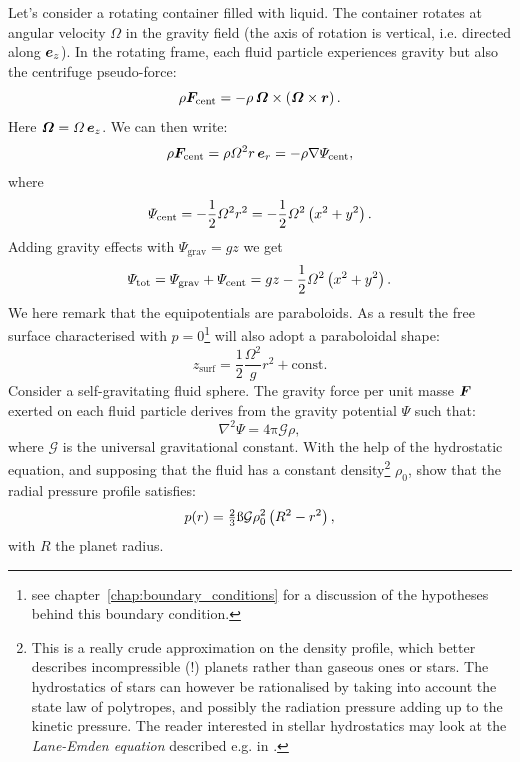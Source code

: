  Let's consider a rotating container filled with liquid. The container rotates at angular velocity $\Omega$ in the gravity field (the axis of rotation is vertical, i.e. directed along  $\matrixsym e_{z}$). In the rotating frame, each fluid particle experiences gravity but also the centrifuge pseudo-force:
\begin{equation}
\rho\bF_\text{cent} = -\rho \,\matrixsym \Omega \times \lp \matrixsym  \Omega \times \matrixsym r\rp.
\end{equation}
Here $\matrixsym \Omega = \Omega \,\matrixsym e_{z}$. We can then write:
\begin{equation}
\rho\bF_\text{cent} = \rho \Omega^2 r \,\matrixsym e_{r} = -\rho \nabla \Psi_\text{cent},
\end{equation}
where
\begin{equation}
\Psi_\text{cent} = -\frac{1}{2} \Omega^2 r^2 = -\frac{1}{2} \Omega^2 \left( x^2 + y^2\right).
\end{equation}
Adding gravity effects with $\Psi_\text{grav} = gz$ we get 
\begin{equation}
\Psi_\text{tot} = \Psi_\text{grav} + \Psi_\text{cent}  = gz -\frac{1}{2} \Omega^2 \left( x^2 + y^2\right).
\end{equation} 
We here remark that the equipotentials are paraboloids. As a result the free surface characterised with $p = 0$\footnote{see chapter~\ref{chap:boundary_conditions} for a discussion of the hypotheses behind this boundary condition.} will also adopt a paraboloidal shape:
\begin{equation}
z_\text{surf} = \frac{1}{2} \frac{\Omega^2}{g} r^2 + \text{const}.
\end{equation}
 Consider a self-gravitating fluid sphere. The gravity force per unit masse $\bF$ exerted on each fluid particle derives from the gravity potential $\Psi$ such that:
\begin{equation}
\nabla^2 \Psi = 4 \mathrm \pi \mathcal G \rho,
\end{equation}
where $\mathcal G$ is the universal gravitational constant. With the help of the hydrostatic equation, and supposing that the fluid has a constant density\footnote{This is a really crude approximation on the density profile, which better describes incompressible (!) planets rather than gaseous ones or stars. The hydrostatics of stars can however be rationalised by taking into account the state law of polytropes, and possibly the radiation pressure adding up to the kinetic pressure. The reader interested in stellar hydrostatics may look at the \textit{Lane-Emden equation} described e.g. in \citet[][chap. IV]{Chandrasekhar1957}.} $\rho_0$, show that the radial pressure profile satisfies:
\begin{equation}
p(r) = \tfrac{2}{3} \mathrm \pi \mathcal G \rho_0^2 \left( R^2 - r^2\right),
\end{equation}
with $R$ the planet radius.
